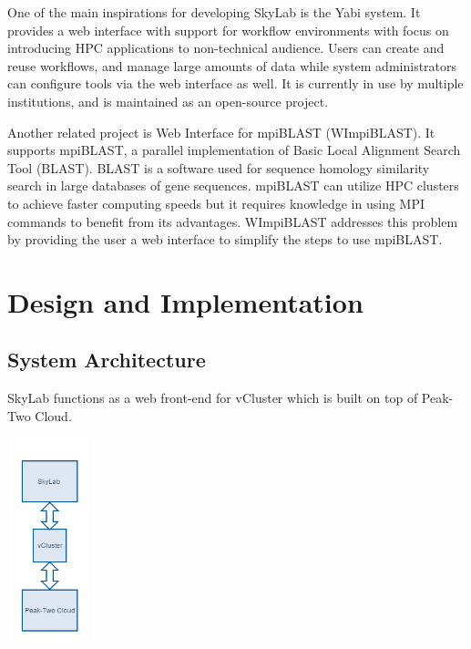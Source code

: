 One of the main inspirations for developing SkyLab is the Yabi system. It provides a web interface with support for workflow environments with focus on introducing HPC applications to non-technical audience. Users can create and reuse workflows, and manage large amounts of data while system administrators can configure tools via the web interface as well. It is currently in use by multiple institutions, and is maintained as an open-source project\cite{7411021620120101}.	    	    
	    
Another related project is Web Interface for mpiBLAST (WImpiBLAST). It supports mpiBLAST, a parallel implementation of Basic Local Alignment Search Tool (BLAST). BLAST is a software used for sequence homology similarity search in large databases of gene sequences. mpiBLAST can utilize HPC clusters to achieve faster computing speeds but it requires knowledge in using MPI commands to benefit from its advantages. WImpiBLAST addresses this problem by providing the user a web interface to simplify the steps to use mpiBLAST\cite{9686120720140601}.   
        
\section{Design and Implementation}

\subsection{System Architecture}
SkyLab functions as a web front-end for vCluster which is built on top of Peak-Two Cloud.
	\begin{center}			
		\includegraphics[width=92px,height=224px]{./images/system_architecture.png}			
	\end{center}	
    



